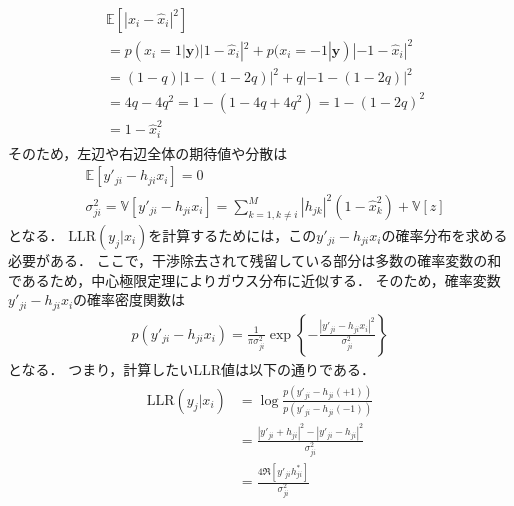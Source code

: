 \documentclass[twocolumn, a4paper]{ieicejsp}
\newcommand{\ABS}[1]{\left|#1\right|}
\newcommand{\Brkts}[1]{\left\{#1\right\}}
\newcommand{\BRKTS}[1]{\left[#1\right]}
\begin{document}
\begin{align}
  \begin{split}
    &\mathbb{E}[|x_i-\hat{x}_i|^2] \\
    &= p(x_i=1 | \mathbf{y}) |1-\hat{x}_i|^2 + p(x_i=-1 | \mathbf{y}) |-1-\hat{x}_i|^2 \\
    &= (1-q) |1 - (1-2q)|^2 + q |-1-(1-2q)|^2 \\
    &= 4q - 4q^2 = 1 - (1 - 4q + 4q^2) = 1 - (1 - 2q)^2 \\
    &= 1 - \hat{x}_i^2
  \end{split}
\end{align}
そのため，左辺や右辺全体の期待値や分散は
\begin{align}
  &\mathbb{E}[y'_{ji} - h_{ji} x_i] = 0 \\
  &\sigma_{ji}^2 = \mathbb{V}[y'_{ji} - h_{ji}x_i] = \sum_{k=1,k\not=i}^{M} |h_{jk}|^2 (1- \hat{x}_k^2) + \mathbb{V}[z]
\end{align}
となる．
$\mathrm{LLR}(y_j | x_i)$を計算するためには，この$y'_{ji} - h_{ji} x_i$の確率分布を求める必要がある．
ここで，干渉除去されて残留している部分は多数の確率変数の和であるため，中心極限定理によりガウス分布に近似する．
そのため，確率変数$y'_{ji} - h_{ji} x_i$の確率密度関数は
\begin{align}
  p(y'_{ji} - h_{ji} x_i) = \frac{1}{\pi \sigma_{ji}^2} \exp\Brkts{-\frac{\ABS{y'_{ji} - h_{ji} x_i}^2}{\sigma_{ji}^2}}
\end{align}
となる．
つまり，計算したいLLR値は以下の通りである．
\begin{align}
  \begin{split}
    \mathrm{LLR}(y_j | x_i) &= \log \frac{p(y'_{ji} - h_{ji} (+1))}{p(y'_{ji} - h_{ji} (-1))} \\
    &= \frac{\ABS{y'_{ji} + h_{ji}}^2 - \ABS{y'_{ji} - h_{ji}}^2}{\sigma_{ji}^2} \\
    &=  \frac{4\Re\BRKTS{y'_{ji} h_{ji}^{*} }}{\sigma_{ji}^2}
  \end{split}
\end{align}
\end{document}
